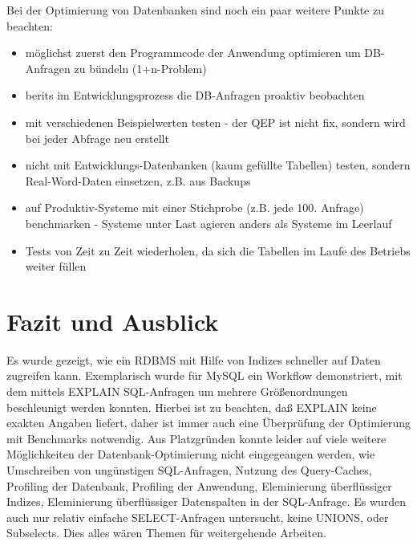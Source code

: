 Bei der Optimierung von Datenbanken sind noch ein paar weitere Punkte zu beachten:
\begin{itemize} 
	\item möglichst zuerst den Programmcode der Anwendung optimieren um DB-Anfragen zu bündeln (1+n-Problem)
	\item berits im Entwicklungsprozess die DB-Anfragen proaktiv beobachten
	\item mit verschiedenen Beispielwerten testen - der QEP ist nicht fix, sondern wird bei jeder Abfrage neu erstellt
	\item nicht mit Entwicklungs-Datenbanken (kaum gefüllte Tabellen) testen, sondern Real-Word-Daten einsetzen, z.B. aus Backups
	\item auf Produktiv-Systeme mit einer Stichprobe (z.B. jede 100. Anfrage) benchmarken - Systeme unter Last agieren anders als Systeme im Leerlauf
	\item Tests von Zeit zu Zeit wiederholen, da sich die Tabellen im Laufe des Betriebs weiter füllen
\end{itemize}

\section{Fazit und Ausblick}

Es wurde gezeigt, wie ein RDBMS mit Hilfe von Indizes schneller auf Daten zugreifen kann.
Exemplarisch wurde für MySQL ein Workflow demonstriert, mit dem mittels EXPLAIN SQL-Anfragen um mehrere Größenordnungen beschleunigt werden konnten.
Hierbei ist zu beachten, daß EXPLAIN keine exakten Angaben liefert, daher ist immer auch eine Überprüfung der Optimierung mit Benchmarks notwendig.
Aus Platzgründen konnte leider auf viele weitere Möglichkeiten der Datenbank-Optimierung nicht eingegeangen werden, wie Umschreiben von ungünstigen SQL-Anfragen, Nutzung des Query-Caches, Profiling der Datenbank, Profiling der Anwendung, Eleminierung überflüssiger Indizes, Eleminierung überflüssiger Datenspalten in der SQL-Anfrage. 
Es wurden auch nur relativ einfache SELECT-Anfragen untersucht, keine UNIONS, oder Subselects.
Dies alles wären Themen für weitergehende Arbeiten. 

